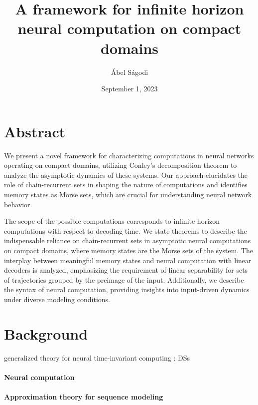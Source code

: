 \documentclass{scrartcl}
\title{A framework for infinite horizon neural computation on compact domains}
\author{\'Abel S\'agodi}
\date{September 1, 2023}
\theoremstyle{definition}
\theoremstyle{remark}
\begin{document}
\maketitle


\section*{Abstract}
We present a novel framework for characterizing computations in neural networks operating on compact domains, utilizing Conley’s decomposition theorem to analyze the asymptotic dynamics of these systems. Our approach elucidates the role of chain-recurrent sets in shaping the nature of computations and identifies memory states as Morse sets, which are crucial for understanding neural network behavior.

The scope of the possible computations corresponds to infinite horizon computations with respect to decoding time.
We state theorems to describe the indispensable reliance on chain-recurrent sets in asymptotic neural computations on compact domains, where memory states are the Morse sets of the system.
The interplay between meaningful memory states and neural computation with linear decoders is analyzed, emphasizing the requirement of linear separability for sets of trajectories grouped by the preimage of the input. 
Additionally, we describe the syntax of neural computation, providing insights into input-driven dynamics under diverse modeling conditions. 



\newpage
\section{Background}%

generalized theory for neural time-invariant computing \citep{jaeger2021,jaeger2023theory}:
DSs



\paragraph{Neural computation}



\paragraph{Approximation theory for sequence modeling}
\citep{jiang2023brief}

\citep{li2020curse}
\citep{li2022approximation}
\end{document}

